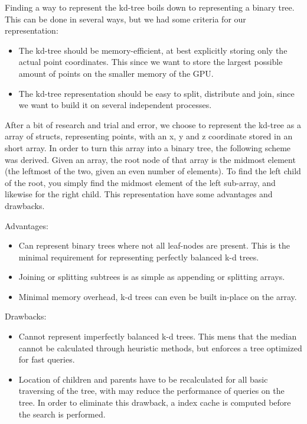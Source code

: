 Finding a way to represent the kd-tree boils down to representing a binary tree. This can be done in several ways, but we had some criteria for our representation:

\begin{itemize}
    \item The kd-tree should be memory-efficient, at best explicitly storing only the actual point coordinates. This since we want to store the largest possible amount of points on the smaller memory of the GPU.
    \item The kd-tree representation should be easy to split, distribute and join, since we want to build it on several independent processes.
\end{itemize}

After a bit of research and trial and error, we choose to represent the kd-tree as a array of structs, representing points, with an x, y and z coordinate stored in an short array. In order to turn this array into a binary tree, the following scheme was derived. Given an array, the root node of that array is the midmost element (the leftmost of the two, given an even number of elements). To find the left child of the root, you simply find the midmost element of the left sub-array, and likewise for the right child. This representation have some advantages and drawbacks.

Advantages:
\begin{itemize}
    \item Can represent binary trees where not all leaf-nodes are present. This is the minimal requirement for representing perfectly balanced k-d trees.
    \item Joining or splitting subtrees is as simple as appending or splitting arrays.
    \item Minimal memory overhead, k-d trees can even be built in-place on the array.
\end{itemize}

Drawbacks:
\begin{itemize}
    \item Cannot represent imperfectly balanced k-d trees. This mens that the median cannot be calculated through heuristic methods, but enforces a tree optimized for fast queries.
    \item Location of children and parents have to be recalculated for all basic traversing of the tree, with may reduce the performance of queries on the tree. In order to eliminate this drawback, a index cache is computed before the search is performed.
\end{itemize}

